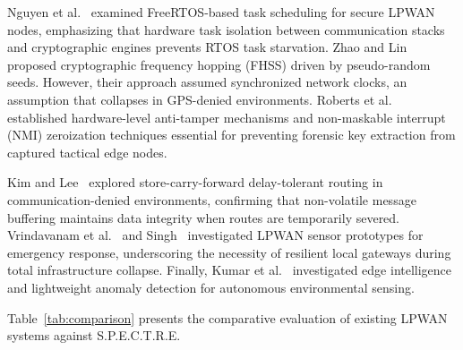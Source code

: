 \documentclass[conference]{IEEEtran}
\begin{document}
Nguyen et al.~\cite{nguyen2024} examined FreeRTOS-based task scheduling for secure LPWAN nodes, emphasizing that hardware task isolation between communication stacks and cryptographic engines prevents RTOS task starvation. Zhao and Lin~\cite{zhao2024} proposed cryptographic frequency hopping (FHSS) driven by pseudo-random seeds. However, their approach assumed synchronized network clocks, an assumption that collapses in GPS-denied environments. Roberts et al.~\cite{roberts2024} established hardware-level anti-tamper mechanisms and non-maskable interrupt (NMI) zeroization techniques essential for preventing forensic key extraction from captured tactical edge nodes.

Kim and Lee~\cite{kim2023} explored store-carry-forward delay-tolerant routing in communication-denied environments, confirming that non-volatile message buffering maintains data integrity when routes are temporarily severed. Vrindavanam et al.~\cite{vrindavanam2020} and Singh~\cite{singh2023_survey} investigated LPWAN sensor prototypes for emergency response, underscoring the necessity of resilient local gateways during total infrastructure collapse. Finally, Kumar et al.~\cite{kumar2025} investigated edge intelligence and lightweight anomaly detection for autonomous environmental sensing.

Table~\ref{tab:comparison} presents the comparative evaluation of existing LPWAN systems against S.P.E.C.T.R.E.
\end{document}

